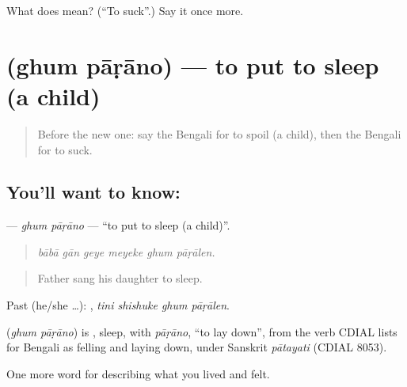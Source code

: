 \begin{tcolorbox}[breakable,colback=teal!4,colframe=teal!35!black,title={Before you move on}]
What does  mean? (\textquotedblleft{}To suck\textquotedblright{}.) Say it once more.
\end{tcolorbox}
\section[\texorpdfstring{\bn{ঘুম} \bn{পাড়ানো} (ghum pāṛāno)}{ঘুম পাড়ানো (ghum pāṛāno)}]{  (ghum pāṛāno) — to put to sleep (a child)}

\label{lesson:BN-C486-ghum-parano}



\begin{quote}
Before the new one: say the Bengali for to spoil (a child), then the Bengali for to suck.
\end{quote}

\subsection*{You'll want to know:  }
\textbf{ } — \emph{ghum pāṛāno} — \textquotedblleft{}to put to sleep (a child)\textquotedblright{}.

\begin{quote}
     
\end{quote}

\begin{quote}
\emph{bābā gān geye meyeke ghum pāṛālen.}
\end{quote}

\begin{quote}
Father sang his daughter to sleep.
\end{quote}

Past (he/she …):    , \emph{tini shishuke ghum pāṛālen}.

\begin{cousinweb}
\textbf{ } (\emph{ghum pāṛāno}) is , sleep, with \emph{pāṛāno}, \textquotedblleft{}to lay down\textquotedblright{}, from the verb CDIAL lists for Bengali as felling and laying down, under Sanskrit \emph{pātayati} (CDIAL 8053).
\end{cousinweb}

\begin{grammarlens}[title={What you've built}]
One more word for describing what you lived and felt.
\end{grammarlens}


